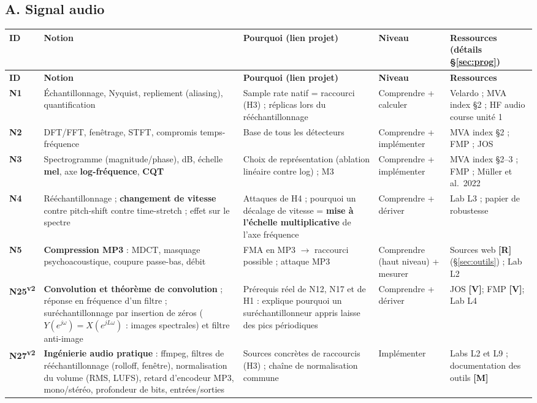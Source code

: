 \documentclass[11pt,a4paper]{article}
\providecommand{\og}{\guillemotleft\nobreakspace}%
\providecommand{\fg}{\nobreakspace\guillemotright}}
\newcommand{\vtwo}{\textsuperscript{\textcolor{orange!80!black}{\textbf{v2}}}}
\newcommand{\lV}{\textbf{\textcolor{green!45!black}{[V]}}}
\newcommand{\lR}{\textbf{\textcolor{orange!80!black}{[R]}}}
\newcommand{\lM}{\textbf{\textcolor{red!70!black}{[M]}}}
\begin{document}
\subsection{A. Signal audio}
{\footnotesize
\begin{longtable}{L{0.95cm}L{4.1cm}L{4.6cm}L{2.2cm}L{3.3cm}}
\toprule
\textbf{ID} & \textbf{Notion} & \textbf{Pourquoi (lien projet)} & \textbf{Niveau} & \textbf{Ressources (détails §\ref{sec:prog})}\\
\midrule
\endfirsthead
\toprule
\textbf{ID} & \textbf{Notion} & \textbf{Pourquoi (lien projet)} & \textbf{Niveau} & \textbf{Ressources}\\
\midrule
\endhead
\bottomrule
\endfoot
\textbf{N1} & Échantillonnage, Nyquist, repliement (aliasing), quantification & Sample rate natif = raccourci (H3) ; réplicas lors du rééchantillonnage & Comprendre + calculer & Velardo ; MVA index §2 ; HF audio course unité 1\\
\addlinespace
\textbf{N2} & DFT/FFT, fenêtrage, STFT, compromis temps-fréquence & Base de tous les détecteurs & Comprendre + implémenter & MVA index §2 ; FMP ; JOS\\
\addlinespace
\textbf{N3} & Spectrogramme (magnitude/phase), dB, échelle \textbf{mel}, axe \textbf{log-fréquence}, \textbf{CQT} & Choix de représentation (ablation \og{}linéaire contre log\fg{}) ; M3 & Comprendre + implémenter & MVA index §2--3 ; FMP ; Müller et al.\ 2022\\
\addlinespace
\textbf{N4} & Rééchantillonnage ; \textbf{changement de vitesse} contre pitch-shift contre time-stretch ; effet sur le spectre & Attaques de H4 ; pourquoi un décalage de vitesse = \textbf{mise à l'échelle multiplicative} de l'axe fréquence & Comprendre + dériver & Lab L3 ; papier de robustesse\\
\addlinespace
\textbf{N5} & \textbf{Compression MP3} : MDCT, masquage psychoacoustique, coupure passe-bas, débit & FMA en MP3 $\rightarrow$ raccourci possible ; attaque MP3 & Comprendre (haut niveau) + mesurer & Sources web \lR{} (§\ref{sec:outils}) ; Lab L2\\
\addlinespace
\textbf{N25}\vtwo & \textbf{Convolution et théorème de convolution} ; réponse en fréquence d'un filtre ; suréchantillonnage par insertion de zéros ($Y(e^{j\omega})=X(e^{jL\omega})$ : images spectrales) et filtre anti-image & Prérequis réel de N12, N17 et de H1 : explique pourquoi un suréchantillonneur appris laisse des pics périodiques & Comprendre + dériver & JOS \lV ; FMP \lV ; Lab L4\\
\addlinespace
\textbf{N27}\vtwo & \textbf{Ingénierie audio pratique} : ffmpeg, filtres de rééchantillonnage (rolloff, fenêtre), normalisation du volume (RMS, LUFS), retard d'encodeur MP3, mono/stéréo, profondeur de bits, entrées/sorties & Sources concrètes de raccourcis (H3) ; chaîne de normalisation commune & Implémenter & Labs L2 et L9 ; documentation des outils \lM\\
\end{longtable}}
\end{document}
